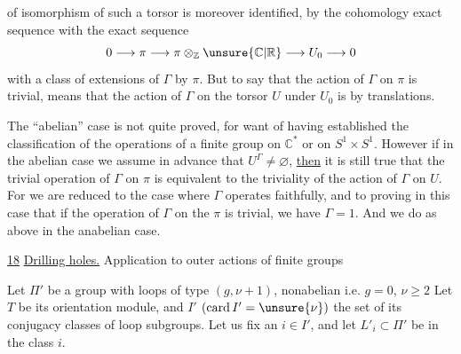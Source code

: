 
of isomorphism of such a torsor is moreover identified, by the cohomology exact sequence  with the exact sequence
\[
0 \longrightarrow \pi \longrightarrow
\pi\otimes_{\mathbb Z}\unsure{\mathbb C|\mathbb R}
\longrightarrow U_0 \longrightarrow 0
\]
with a class of extensions of \(\Gamma\) by \(\pi\).
But to say that the action of \(\Gamma\) on \(\pi\) is trivial, means that the action of \(\Gamma\) on the torsor \(U\) under \(U_0\) is by translations.

\uline{} The ``abelian'' case is not quite proved, for want of having established the  classification  of the operations of a finite group on \(\mathbb C^{*}\) or on \(S^1\times S^1\). However if in the abelian case we assume in advance that \(U^\Gamma\ne\varnothing\), \uline{then}  it is still true that the trivial operation of \(\Gamma\) on \(\pi\) is equivalent to the triviality of the action of \(\Gamma\) on \(U\). For we are reduced to the case where \(\Gamma\) operates faithfully, and to proving in this case that if the operation of \(\Gamma\) on the \(\pi\) is trivial, we have \(\Gamma=1\). And we do as above in the anabelian case.


\uline{18} \uline{Drilling holes.} Application to outer actions of finite groups

Let \(\Pi'\) be a group with loops of type \((g,\nu+1)\), nonabelian i.e.   \(g=0\),  \(\nu\ge2\)
Let \(T\) be its orientation module, and \(I'\) \((\operatorname{card}I'=\unsure{\nu})\) the set of its conjugacy classes of loop subgroups. Let us fix an \(i\in I'\), and let \(L'_i\subset\Pi'\) be in the class \(i\).

